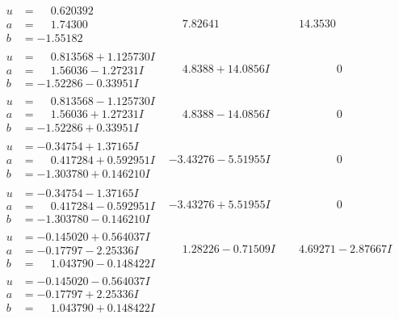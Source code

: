 \documentclass[1p]{elsarticle_modified}
\theoremstyle{definition}
\begin{document}
$$\begin{array}{c|c|c}
\begin{aligned}
u &= \phantom{-}0.620392\phantom{ +0.000000I} \\
a &= \phantom{-}1.74300\phantom{ +0.000000I} \\
b &= -1.55182\phantom{ +0.000000I}\end{aligned}
 & \phantom{-}7.82641\phantom{ +0.000000I} & \phantom{-}14.3530\phantom{ +0.000000I} \\ \hline\begin{aligned}
u &= \phantom{-}0.813568 + 1.125730 I \\
a &= \phantom{-}1.56036 - 1.27231 I \\
b &= -1.52286 - 0.33951 I\end{aligned}
 & \phantom{-}4.8388 + 14.0856 I & \phantom{-0.000000 } 0 \\ \hline\begin{aligned}
u &= \phantom{-}0.813568 - 1.125730 I \\
a &= \phantom{-}1.56036 + 1.27231 I \\
b &= -1.52286 + 0.33951 I\end{aligned}
 & \phantom{-}4.8388 - 14.0856 I & \phantom{-0.000000 } 0 \\ \hline\begin{aligned}
u &= -0.34754 + 1.37165 I \\
a &= \phantom{-}0.417284 + 0.592951 I \\
b &= -1.303780 + 0.146210 I\end{aligned}
 & -3.43276 - 5.51955 I & \phantom{-0.000000 } 0 \\ \hline\begin{aligned}
u &= -0.34754 - 1.37165 I \\
a &= \phantom{-}0.417284 - 0.592951 I \\
b &= -1.303780 - 0.146210 I\end{aligned}
 & -3.43276 + 5.51955 I & \phantom{-0.000000 } 0 \\ \hline\begin{aligned}
u &= -0.145020 + 0.564037 I \\
a &= -0.17797 - 2.25336 I \\
b &= \phantom{-}1.043790 - 0.148422 I\end{aligned}
 & \phantom{-}1.28226 - 0.71509 I & \phantom{-}4.69271 - 2.87667 I \\ \hline\begin{aligned}
u &= -0.145020 - 0.564037 I \\
a &= -0.17797 + 2.25336 I \\
b &= \phantom{-}1.043790 + 0.148422 I\end{aligned}

\end{array}$$
\end{document}
